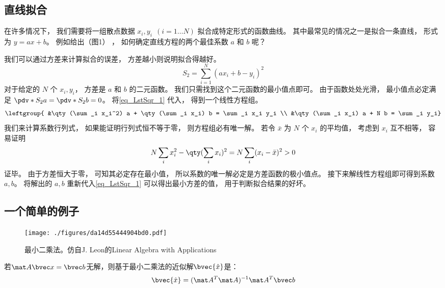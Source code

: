 
\begin{issues}
\issueTODO
\end{issues}


\subsection{直线拟合}
在许多情况下， 我们需要将一组散点数据 $x_i, y_i \ \ (i = 1\dots N)$ 拟合成特定形式的函数曲线。 其中最常见的情况之一是拟合一条直线， 形式为 $y = ax + b$。 例如给出（图1）%
， 如何确定直线方程的两个最佳系数 $a$ 和 $b$ 呢？

我们可以通过方差来计算拟合的误差， 方差越小则说明拟合得越好。
\begin{equation}\label{eq_LstSqr_1}
S_2 = \sum_{i = 1}^N (a x_i + b - y_i)^2
\end{equation}
对于给定的 $N$ 个 $x_i, y_i$， 方差是 $a$ 和 $b$ 的二元函数。 我们只需找到这个二元函数的最小值点即可。 由于函数处处光滑， 最小值点必定满足 $\pdv*{S_2}{a} = \pdv*{S_2}{b} = 0$。 将\autoref{eq_LstSqr_1} 代入， 得到一个线性方程组。
\begin{equation}
\leftgroup{
&\qty(\sum_i x_i^2) a + \qty(\sum_i x_i) b = \sum_i x_i y_i \\
&\qty(\sum_i x_i) a + N b = \sum_i y_i}
\end{equation}
我们来计算系数行列式， 如果能证明行列式恒不等于零， 则方程组必有唯一解。%
若令 $\bar x$ 为 $N$ 个 $x_i$ 的平均值， 考虑到 $x_i$ 互不相等， 容易证明
\begin{equation}
N\sum_i x_i^2 - \qty(\sum_i x_i)^2 = N\sum_i (x_i - \bar x)^2 > 0
\end{equation}
证毕。 由于方差恒大于零， 可知其必定存在最小值， 所以系数的唯一解必定是方差函数的极小值点。 接下来解线性方程组即可得到系数 $a, b$。 将解出的 $a,b$ 重新代入\autoref{eq_LstSqr_1} 可以得出最小方差的值， 用于判断拟合结果的好坏。

\subsection{一个简单的例子}
\begin{figure}[ht]
\centering
\texttt{[image: ./figures/da14d55444904bd0.pdf]}
\caption{最小二乘法。仿自J. Leon的Linear Algebra with Applications} \label{fig_LstSqr_1}
\end{figure}
若$\mat A \bvec x = \bvec b$无解，则基于最小二乘法的近似解$\bvec {\hat x} $是：
\begin{equation}
\bvec {\hat x} = (\mat A^T \mat A)^{-1}\mat A^T \bvec b
\end{equation}

